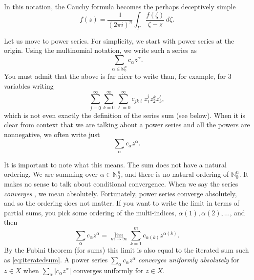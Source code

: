 \documentclass[12pt,openany]{book}
\newcommand{\sabs}[1]{\lvert {#1} \rvert}
\newcommand{\N}{{\mathbb{N}}}
\newcommand{\myindex}[1]{#1\index{#1}}
\theoremstyle{plain}
\theoremstyle{remark}
\theoremstyle{definition}
\theoremstyle{exercise}
\theoremstyle{example}
\begin{document}
In this notation, the Cauchy formula becomes the perhaps deceptively simple
\begin{equation*}
f(z) =
\frac{1}{{(2\pi i)}^n}
\int_{\Gamma}
\frac{f(\zeta)}{\zeta-z}
\,
d \zeta .
\end{equation*}

Let us move to power series.  For simplicity, we start with
power series at the origin.  Using the multinomial notation, we write
such a series as
\begin{equation*}
\sum_{\alpha \in \N_0^n} c_\alpha {z}^\alpha .
\end{equation*}
You must admit that the
above is far nicer to write than, for example, for 3 variables writing
\begin{equation} \label{eq:iteratedsum}
\sum_{j=0}^\infty
\sum_{k=0}^\infty
\sum_{\ell=0}^\infty
c_{jk\ell} z_1^jz_2^kz_3^\ell ,
\end{equation}
which is not even exactly the definition of the series sum (see
below).
When it is clear
from context that we are talking about a power series
and all the powers are nonnegative,
we often write just
%
\begin{equation*}
\sum_{\alpha} c_\alpha {z}^\alpha .
\end{equation*}

It is important to note what this means.  The sum does not
have a natural ordering.  We are summing over $\alpha \in \N_0^n$, and there
is no natural ordering of $\N_0^n$.  It makes no sense to
talk about conditional convergence.  When we say the series
\emph{converges}%
%
, we mean absolutely.
Fortunately, power series converge
absolutely, and so the ordering does not matter.  If you want to write
the limit in terms of partial sums, you pick some ordering of the
multi-indices, $\alpha(1), \alpha(2), \ldots$, and then
\begin{equation*}
\sum_{\alpha}
c_\alpha {z}^\alpha 
=
\lim_{m \to \infty}
\sum_{k=1}^m 
c_{\alpha(k)} {z}^{\alpha(k)} .
\end{equation*}
By the Fubini theorem (for sums) this limit is also equal to the iterated
sum such as \eqref{eq:iteratedsum}.
A power series $\sum_\alpha c_\alpha z^\alpha$
\emph{\myindex{converges uniformly absolutely}}
for $z \in X$ when $\sum_\alpha \sabs{c_\alpha z^\alpha}$
converges uniformly for $z \in X$.
\end{document}
